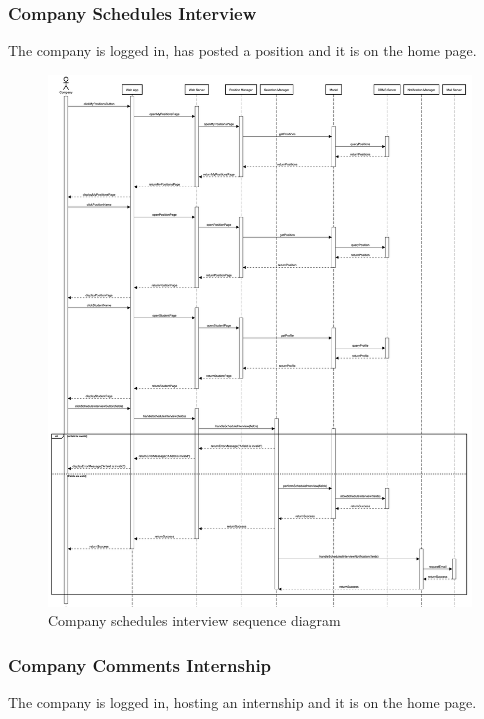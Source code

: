 \clearpage
\subsubsection{Company Schedules Interview}
The company is logged in, has posted a position and it is on the home page.

\begin{figure}[h!]
    \centering
    \includegraphics[width=14cm]{images/sequence-diagrams/company-schedules-interview.png}
    \caption{Company schedules interview sequence diagram}
\end{figure}

\clearpage
\subsubsection{Company Comments Internship}
The company is logged in, hosting an internship and it is on the home page.

